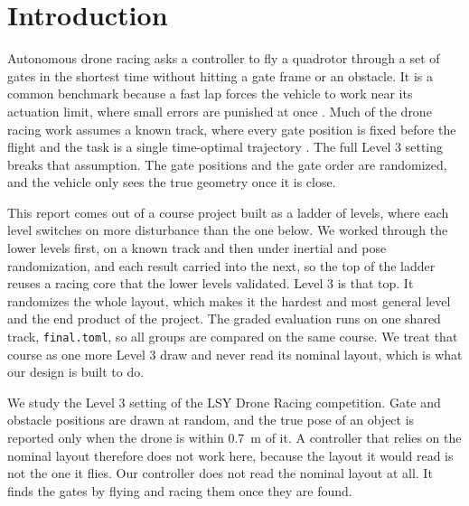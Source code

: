 \documentclass[conference]{IEEEtran}
\begin{document}
\section{Introduction}
Autonomous drone racing asks a controller to fly a quadrotor through a set of gates in the shortest time without hitting a gate frame or an obstacle. It is a common benchmark because a fast lap forces the vehicle to work near its actuation limit, where small errors are punished at once \cite{survey}. Much of the drone racing work assumes a known track, where every gate position is fixed before the flight and the task is a single time-optimal trajectory \cite{foehn,minsnap}. The full Level 3 setting breaks that assumption. The gate positions and the gate order are randomized, and the vehicle only sees the true geometry once it is close.

This report comes out of a course project built as a ladder of levels, where each level switches on more disturbance than the one below. We worked through the lower levels first, on a known track and then under inertial and pose randomization, and each result carried into the next, so the top of the ladder reuses a racing core that the lower levels validated. Level 3 is that top. It randomizes the whole layout, which makes it the hardest and most general level and the end product of the project. The graded evaluation runs on one shared track, \texttt{final.toml}, so all groups are compared on the same course. We treat that course as one more Level 3 draw and never read its nominal layout, which is what our design is built to do.

We study the Level 3 setting of the LSY Drone Racing competition. Gate and obstacle positions are drawn at random, and the true pose of an object is reported only when the drone is within 0.7~m of it. A controller that relies on the nominal layout therefore does not work here, because the layout it would read is not the one it flies. Our controller does not read the nominal layout at all. It finds the gates by flying and racing them once they are found.
\end{document}

